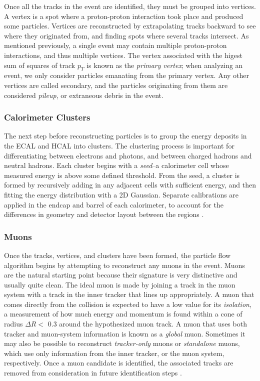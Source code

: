 Once all the tracks in the event are identified, they must be grouped
into vertices. A vertex is a spot where a proton-proton interaction
took place and produced some particles. Vertices are reconstructed by
extrapolating tracks backward to see where they originated from, and finding
spots where several tracks intersect. As mentioned previously, a
single event may contain multiple proton-proton interactions, and thus
multiple vertices. The vertex associated with the higest sum of
squares of track $p_T$ is known as the \emph{primary vertex}; when
analyzing an event, we only consider particles emanating from the
primary vertex. Any other vertices are called secondary, and the
particles originating from them are considered \emph{pileup}, or
extraneous debris in the event.

\subsubsection{Calorimeter Clusters}
\label{sssec:cms:pf:caloclusters}

The next step before reconstructing particles is to group the energy
deposits in the ECAL and HCAL into clusters. The clustering process
is important for differentiating between electrons and photons, and
between charged hadrons and neutral hadrons. Each cluster begins with
a \emph{seed}--a calorimeter cell whose measured energy is above some defined
threshold. From the seed, a cluster is formed by
recursively adding in any adjacent cells with sufficient energy, and
then fitting the energy distribution with a 2D Gaussian. Separate
calibrations are applied in the endcap and barrel of each calorimeter,
to account for the differences in geometry and detector layout between
the regions \cite{particleflow}.

\subsubsection{Muons}
\label{sssec:cms:pf:muons}

Once the tracks, vertices, and clusters have been formed, the particle
flow algorithm begins by attempting to reconstruct any muons in the
event. Muons are the natural starting point because their signature is
very distinctive and usually quite clean. The ideal muon is made by joining a
track in the muon system with a track in the inner tracker that lines
up appropriately. A muon that comes directly from the collision is expected
to have a low value for its \emph{isolation}, a measurement of how
much energy and momentum is found within a cone of radius $\Delta R <$
0.3 around the hypothesized muon track. A muon
that uses both tracker and muon-system information is known as a
\emph{global} muon. Sometimes it may also be possible to reconstruct
\emph{tracker-only} muons or \emph{standalone} muons, which use only
information from the inner tracker, or the muon system,
respectively. Once a muon candidate is identified, the associated
tracks are removed from consideration in future identification
steps \cite{particleflow}.

